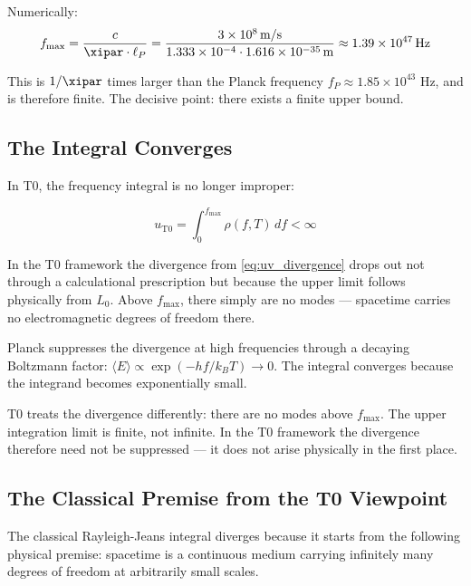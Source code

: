 Numerically:
\begin{equation}
    f_{\max} = \frac{c}{\xipar \cdot \ell_P} 
    = \frac{3 \times 10^8 \, \text{m/s}}{1.333 \times 10^{-4} \cdot 1.616 \times 10^{-35} \, \text{m}}
    \approx 1.39 \times 10^{47} \, \text{Hz}
    \label{eq:f_max_numerical}
\end{equation}

This is $1/\xipar$ times larger than the Planck frequency $f_P \approx 1.85 \times 10^{43}$ Hz, 
and is therefore finite. The decisive point: there exists a finite upper bound.

\subsection{The Integral Converges}

In T0, the frequency integral is no longer improper:

\begin{equation}
    u_{\text{T0}} = \int_0^{f_{\max}} \rho(f, T) \, df < \infty
    \label{eq:t0_convergent_integral}
\end{equation}

In the T0 framework the divergence from \eqref{eq:uv_divergence} drops out not through a 
calculational prescription but because the upper limit follows physically from $L_0$. Above $f_{\max}$, there simply 
are no modes — spacetime carries no electromagnetic degrees of freedom there.

\begin{important}
    Planck suppresses the divergence at high frequencies through a decaying 
    Boltzmann factor: $\langle E \rangle \propto \exp(-hf/k_BT) \to 0$. 
    The integral converges because the integrand becomes exponentially small.
    
    T0 treats the divergence differently: there are no 
    modes above $f_{\max}$. The upper integration limit is finite, not infinite. 
    In the T0 framework the divergence therefore need not be suppressed — it does 
    not arise physically in the first place.
\end{important}

\subsection{The Classical Premise from the T0 Viewpoint}

The classical Rayleigh-Jeans integral diverges because it starts from the following 
physical premise: spacetime is a continuous medium carrying infinitely many degrees 
of freedom at arbitrarily small scales.

